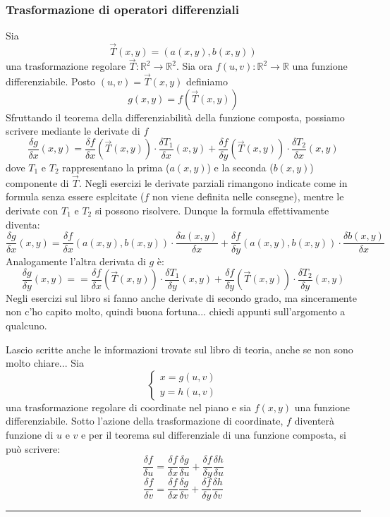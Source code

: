 \subsubsection{Trasformazione di operatori differenziali}
\begin{tcolorbox}
Sia
\[
    \vec{T}(x,y) = (a(x,y), b(x,y))
\]
una trasformazione regolare $\vec{T}: \mathbb{R}^2 \rightarrow \mathbb{R}^2$.\newline
Sia ora $f(u,v) : \mathbb{R}^2 \rightarrow \mathbb{R}$ una funzione differenziabile. Posto $(u,v) = \vec{T}(x,y)$ definiamo 
\[
    g(x,y) = f(\vec{T}(x,y))
\] 
Sfruttando il teorema della differenziabilità della funzione composta, possiamo scrivere mediante le derivate di $f$ 
\[
    \frac{\delta g}{\delta x} (x,y) = \frac{\delta f}{\delta x}(\vec{T}(x,y)) \cdot \frac{\delta T_1}{\delta x}(x,y) + \frac{\delta f}{\delta y} (\vec{T}(x,y)) \cdot \frac{\delta T_2}{\delta x}(x,y)
\]
dove $T_1$ e $T_2$ rappresentano la prima ($a(x,y)$) e la seconda ($b(x,y)$) componente di $\vec{T}$. Negli esercizi le derivate parziali rimangono indicate come in formula senza essere esplcitate ($f$ non viene definita nelle consegne), mentre le derivate con $T_1$ e $T_2$ si possono risolvere. Dunque la formula effettivamente diventa:
\[
    \frac{\delta g}{\delta x} (x,y) = \frac{\delta f}{\delta x}(a(x,y), b(x,y)) \cdot \frac{\delta a(x,y)}{\delta x} + \frac{\delta f}{\delta y} (a(x,y), b(x,y)) \cdot \frac{\delta b(x,y)}{\delta x}
\]
Analogamente l'altra derivata di $g$ è:
\[
    \frac{\delta g}{\delta y}(x,y)= = \frac{\delta f}{\delta x}(\vec{T}(x,y)) \cdot \frac{\delta T_1}{\delta y}(x,y) + \frac{\delta f}{\delta y} (\vec{T}(x,y)) \cdot \frac{\delta T_2}{\delta y}(x,y)
\]
Negli esercizi sul libro si fanno anche derivate di secondo grado, ma sinceramente non c'ho capito molto, quindi buona fortuna... chiedi appunti sull'argomento a qualcuno.
\end{tcolorbox}
Lascio scritte anche le informazioni trovate sul libro di teoria, anche se non sono molto chiare...\newline
Sia 
\[
    \begin{cases}
        x = g(u,v)\\
        y=h(u,v)
    \end{cases}
\]
una trasformazione regolare di coordinate nel piano e sia $f(x,y)$ una funzione differenziabile. Sotto l'azione della trasformazione di coordinate, $f$ diventerà funzione di $u$ e $v$ e per il teorema sul differenziale di una funzione composta, si può scrivere:
\[
    \frac{\delta f}{\delta u} = \frac{\delta f}{\delta x} \frac{\delta g}{\delta u} + \frac{\delta f}{\delta y} \frac{\delta h}{\delta u}
\]
\[
    \frac{\delta f}{\delta v} = \frac{\delta f}{\delta x} \frac{\delta g}{\delta v} + \frac{\delta f}{\delta y} \frac{\delta h}{\delta v}
\]
\rule{\textwidth}{2pt}
